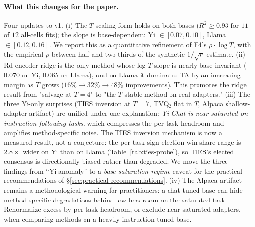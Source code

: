 \paragraph{What this changes for the paper.}
Four updates to v1.
(i) The $T$-scaling form holds on both bases ($R^2 \geq 0.93$ for
$11$ of $12$ all-cells fits); the slope is base-dependent: Yi
$\in [0.07, 0.10]$, Llama $\in [0.12, 0.16]$. We report this as a
quantitative refinement of E4's $\rho \cdot \log T$, with the
empirical $\rho$ between half and two-thirds of the synthetic
$1 / \sqrt{r}$ estimate.
(ii) Rd-encoder ridge is the only method whose log-$T$ slope is
nearly base-invariant ($0.070$ on Yi, $0.065$ on Llama), and on
Llama it dominates TA by an increasing margin as $T$ grows
($16\% \to 32\% \to 48\%$ improvements). This promotes the ridge
result from "salvage at $T = 4$" to "the $T$-stable method on
real adapters."
(iii) The three Yi-only surprises (TIES inversion at $T = 7$,
TVQ$_2$ flat in $T$, Alpaca shallow-adapter artifact) are unified
under one explanation: \emph{Yi-Chat is near-saturated on
instruction-following tasks}, which compresses the per-task
headroom and amplifies method-specific noise. The TIES inversion
mechanism is now a measured result, not a conjecture: the per-task
sign-election win-share range is $2.8 \times$ wider on Yi than on
Llama (Table~\ref{tab:ties-probe}), so TIES's elected consensus is
directionally biased rather than degraded. We move the three
findings from ``Yi anomaly'' to a \emph{base-saturation regime}
caveat for the practical recommendations of
\S\ref{sec:practical-recommendations}.
(iv) The Alpaca artifact remains a methodological warning for
practitioners: a chat-tuned base can hide method-specific
degradations behind low headroom on the saturated task. Renormalize
excess by per-task headroom, or exclude near-saturated adapters,
when comparing methods on a heavily instruction-tuned base.

